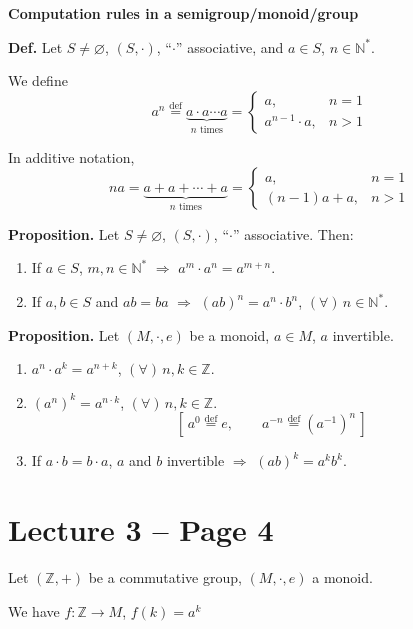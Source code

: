 \noindent\textbf{Computation rules in a semigroup/monoid/group}

\noindent\textbf{Def.} Let $S \neq \varnothing$, $(S,\cdot)$, ``$\cdot$'' associative, and $a \in S$, $n \in \mathbb{N}^*$.

\noindent We define
\[
a^n \overset{\text{def}}{=} \underbrace{a \cdot a \cdots a}_{n \text{ times}} =
\begin{cases}
a, & n=1 \\
a^{n-1}\cdot a, & n>1
\end{cases}
\]

\noindent In additive notation,
\[
na = \underbrace{a+a+\cdots+a}_{n \text{ times}} =
\begin{cases}
a, & n=1 \\
(n-1)a+a, & n>1
\end{cases}
\]

\noindent\textbf{Proposition.} Let $S \neq \varnothing$, $(S,\cdot)$, ``$\cdot$'' associative. Then:
\begin{enumerate}
\item[(1)] If $a \in S$, $m,n \in \mathbb{N}^*$ $\Rightarrow$ $a^m \cdot a^n = a^{m+n}$.
\item[(2)] If $a,b \in S$ and $ab=ba$ $\Rightarrow$ $(ab)^n = a^n \cdot b^n$, $(\forall)\, n \in \mathbb{N}^*$.
\end{enumerate}

\noindent\textbf{Proposition.} Let $(M,\cdot,e)$ be a monoid, $a \in M$, $a$ invertible.
\begin{enumerate}
\item[(1)] $a^n \cdot a^k = a^{n+k}$, $(\forall)\, n,k \in \mathbb{Z}$.
\item[(2)] $(a^n)^k = a^{n\cdot k}$, $(\forall)\, n,k \in \mathbb{Z}$.
\[
\left[\, a^0 \overset{\text{def}}{=} e, \qquad a^{-n} \overset{\text{def}}{=} (a^{-1})^n \,\right]
\]
\item[(3)] If $a\cdot b = b\cdot a$, $a$ and $b$ invertible $\Rightarrow$ $(ab)^k = a^k b^k$.
\end{enumerate}




\section*{Lecture 3 -- Page 4}

\noindent Let $(\mathbb{Z},+)$ be a commutative group, $(M,\cdot,e)$ a monoid.

\noindent We have $f : \mathbb{Z} \to M$, $f(k) = a^k$


